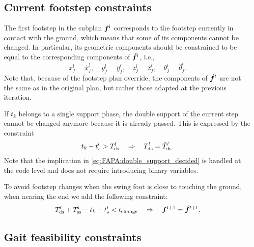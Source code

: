 \subsection{Current footstep constraints}

The first footstep in the subplan ${\bm{f}}^l$ corresponds to the footstep currently in contact with the ground, which means that some of its components cannot be changed. In particular, its geometric components should be constrained to be equal to the corresponding components of $\hat{{\bm{f}}}^l$, i.e.,
\begin{equation}
x_f^l = \hat x_f^l, \quad
y_f^l = \hat y_f^l, \quad
z_f^l = \hat z_f^l, \quad
\theta_f^l = \hat \theta_f^l.
\label{eq:FAPA:current_geometric_constraint}
\end{equation}
Note that, because of the footstep plan override, the components of $\hat{{\bm{f}}}^l$ are not the same as in the original plan, but rather those adapted at the previous iteration.

If $t_k$ belongs to a single support phase, the double support of the current step cannot be changed anymore because it is already passed. This is expressed by the constraint
\begin{equation}
	t_k - t_s^l > T^l_{\rm{ds}} \quad \Rightarrow \quad  T^l_{\rm{ds}} = \hat T^l_{\rm{ds}}.
	\label{eq:FAPA:double_support_decided}
\end{equation}
Note that the implication in \eqref{eq:FAPA:double_support_decided} is handled at the code level and does not require introducing binary variables.

To avoid footstep changes when the swing foot is close to touching the ground, when nearing the end we add the following constraint:
\begin{equation}
\label{eq:FAPA:swing_foot_constraint}
	T^l_{\rm ds} + T^l_{\rm ss} - t_k + t_s^l < t_{\mathrm{change}} \quad \Rightarrow \quad
	{\bm{f}}^{l+1} = \hat{{\bm{f}}}^{l+1}.
\end{equation}

\subsection{Gait feasibility constraints}

